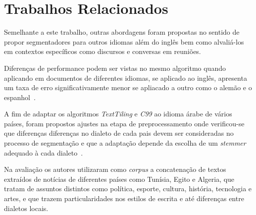 \section{Trabalhos Relacionados}
	\label{sec:trabalhos}


Semelhante a este trabalho, outras abordagens foram propostas no sentido de propor segmentadores para outros idiomas além do inglês bem como alvaliá-los em contextos específicos como discursos e conversas em reuniões.

Diferenças de performance podem ser vistas no mesmo algoritmo quando aplicando em documentos de diferentes idiomas, se aplicado ao inglês, apresenta um taxa de erro significativamente menor se apliacado a outro como o alemão e o espanhol~\cite{Kern2009}.


A fim de adaptar os algoritmos \textit{TextTiling} e \textit{C99} ao idioma árabe de vários países, foram propostos ajustes na etapa de preprocessamento onde verificou-se que diferenças diferenças no dialeto de cada pais devem ser consideradas no processo de segmentação e que a adaptação depende da escolha de um \textit{stemmer} adequado à cada dialeto~\cite{CHAIBI2014}.


Na avaliação os autores utilizaram como \textit{corpus} a concatenação de textos extraídos de notícias de diferentes países como Tunísia, Egito e Algeria, que tratam de assuntos distintos como política, esporte, cultura, história, tecnologia e artes, e que trazem particularidades nos estilos de escrita e até diferenças entre dialetos locais. %



